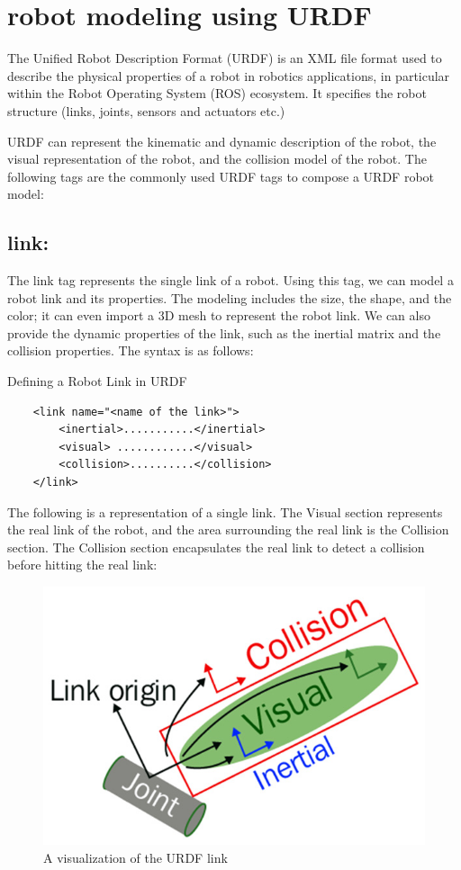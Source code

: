 \documentclass[../../main]{subfiles}
\begin{document}
\lstset{language=XML}

\section{robot modeling using URDF}
The Unified Robot Description Format (URDF) is an XML file format used to describe the physical properties of a robot in robotics applications, in particular within the Robot Operating System (ROS) ecosystem. It specifies the robot structure (links, joints, sensors and actuators etc.)

URDF can represent the kinematic and dynamic description of the robot, the visual
representation of the robot, and the collision model of the robot.
The following tags are the commonly used URDF tags to compose a URDF robot model:

\subsection{link:}\label{tags}
The link tag represents the single link of a robot. Using this tag, we can
model a robot link and its properties. The modeling includes the size, the shape,
and the color; it can even import a 3D mesh to represent the robot link. We can
also provide the dynamic properties of the link, such as the inertial matrix and the
collision properties.
The syntax is as follows:

\begin{codebox}[]{Defining a Robot Link in URDF}
  \begin{verbatim}
    <link name="<name of the link>">
        <inertial>...........</inertial>
        <visual> ............</visual>
        <collision>..........</collision>
    </link>
\end{verbatim}
  \end{codebox}
The following is a representation of a single link. The Visual section represents the
real link of the robot, and the area surrounding the real link is the Collision section.
The Collision section encapsulates the real link to detect a collision before hitting
the real link:
\begin{figure}[h]
\centering
\includegraphics{sublatex/hashem/img/link1.jpg}
\caption{A visualization of the URDF link\cite{joseph2018mastering}}
\end{figure}
\end{document}
